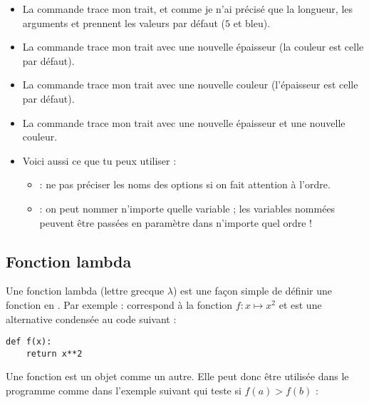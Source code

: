 \documentclass[11pt,class=report,crop=false]{standalone}
\begin{document}
\begin{itemize}
  \item La commande  trace mon trait, et comme je n'ai précisé que la longueur, les arguments  et  prennent les valeurs par défaut ($5$ et bleu).
  
   \item La commande  trace mon trait avec une nouvelle épaisseur (la couleur est celle par défaut).
   
    \item La commande  trace mon trait avec une nouvelle couleur (l'épaisseur est celle par défaut).  
    
     \item La commande  trace mon trait avec une nouvelle épaisseur et une nouvelle couleur.
     
     \item Voici aussi ce que tu peux utiliser :
     \begin{itemize}
       \item {} : ne pas préciser les noms des options si on fait attention à l'ordre.
       \item {} : on peut nommer n'importe quelle variable ; les variables nommées peuvent être passées en paramètre dans n'importe quel ordre !
 
  \end{itemize}   
\end{itemize}   


\subsection{Fonction lambda}

Une fonction lambda (lettre grecque $\lambda$) est une façon simple de définir une fonction en \Python{}. Par
exemple :
correspond à la fonction $f : x \mapsto x^2$ et est une alternative condensée au code suivant :
\begin{lstlisting}
def f(x):
    return x**2
\end{lstlisting} 


\bigskip

Une fonction est un objet \Python{} comme un autre. Elle peut donc être utilisée dans le programme comme dans l'exemple suivant qui teste si $f(a)>f(b)$ :
\end{document}
